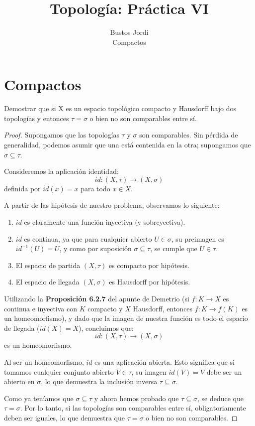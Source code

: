\documentclass{article}
\theoremstyle{plain}
\theoremstyle{definition}
\newenvironment{ejercicio}[1]{\begin{trivlist}
\item[\hskip \labelsep {\bfseries Ejercicio}\hskip \labelsep {\bfseries #1.}]}{\end{trivlist}}
\begin{document}
\title{Topología: Práctica VI}
\author{Bustos Jordi\\Compactos}

\maketitle

\section*{Compactos}

\begin{ejercicio}{1}
    Demostrar que si X es un espacio topológico compacto y Hausdorff bajo dos topologías y entonces \( \tau=\sigma \) o bien no son comparables entre sí.
\end{ejercicio}
\begin{proof}
    Supongamos que las topologías \( \tau \) y \( \sigma \) son comparables. Sin pérdida de generalidad, podemos asumir que una está contenida en la otra; supongamos que \( \sigma \subseteq \tau \).

    Consideremos la aplicación identidad:
    \[ id: (X, \tau) \longrightarrow (X, \sigma) \]
    definida por \( id(x) = x \) para todo \( x \in X \).

    A partir de las hipótesis de nuestro problema, observamos lo siguiente:
    \begin{enumerate}
        \item \( id \) es claramente una función inyectiva (y sobreyectiva).
        \item \( id \) es continua, ya que para cualquier abierto \( U \in \sigma \), su preimagen es \( id^{-1}(U) = U \), y como por suposición \( \sigma \subseteq \tau \), se cumple que \( U \in \tau \).
        \item El espacio de partida \( (X, \tau) \) es compacto por hipótesis.
        \item El espacio de llegada \( (X, \sigma) \) es Hausdorff por hipótesis.
    \end{enumerate}

    Utilizando la \textbf{Proposición 6.2.7} del apunte de Demetrio (si \( f: K \to X \) es continua e inyectiva con \( K \) compacto y \( X \) Hausdorff, entonces \( f: K \to f(K) \) es un homeomorfismo), y dado que la imagen de nuestra función es todo el espacio de llegada (\( id(X) = X \)), concluimos que:
    \[ id: (X, \tau) \longrightarrow (X, \sigma) \]
    es un homeomorfismo.

    Al ser un homeomorfismo, \( id \) es una aplicación abierta. Esto significa que si tomamos cualquier conjunto abierto \( V \in \tau \), su imagen \( id(V) = V \) debe ser un abierto en \( \sigma \), lo que demuestra la inclusión inversa \( \tau \subseteq \sigma \).

    Como ya teníamos que \( \sigma \subseteq \tau \) y ahora hemos probado que \( \tau \subseteq \sigma \), se deduce que \( \tau = \sigma \). Por lo tanto, si las topologías son comparables entre sí, obligatoriamente deben ser iguales, lo que demuestra que \( \tau = \sigma \) o bien no son comparables.
\end{proof}
\end{document}
